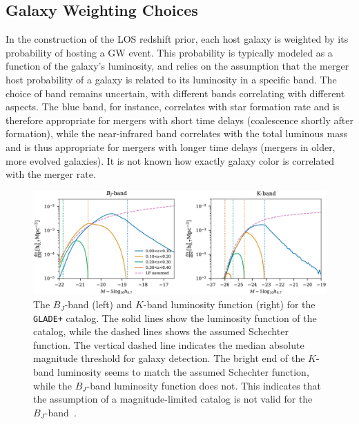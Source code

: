 
\subsection{Galaxy Weighting Choices}
In the construction of the \ac{LOS} redshift prior, each host galaxy is weighted by its probability of hosting a \ac{GW} event. This probability is typically modeled as a function of the galaxy's luminosity, and relies on the assumption that the merger host probability of a galaxy is related to its luminosity in a specific band. The choice of band remains uncertain, with different bands correlating with different aspects. The blue band, for instance, correlates with star formation rate and is therefore appropriate for mergers with short time delays (coalescence shortly after formation), while the near-infrared band correlates with the total luminous mass and is thus appropriate for mergers with longer time delays (mergers in older, more evolved galaxies). It is not known how exactly galaxy color is correlated with the merger rate.

\begin{figure}[ht]
    \centering
    \includegraphics[width=\textwidth]{figures/apjac74bbf15_hr.jpg}
    \caption[The $B_J$-band and $K$-band luminosity function for the \texttt{GLADE+} catalog.]{The $B_J$-band (left) and $K$-band luminosity function (right) for the \texttt{GLADE+} catalog. The solid lines show the luminosity function of the catalog, while the dashed lines shows the assumed Schechter function. The vertical dashed line indicates the median absolute magnitude threshold for galaxy detection. The bright end of the $K$-band luminosity seems to match the assumed Schechter function, while the $B_J$-band luminosity function does not. This indicates that the assumption of a magnitude-limited catalog is not valid for the $B_J$-band~\citep{abbott2023constraints}.}
    \label{fig:luminosity_function}
\end{figure}

